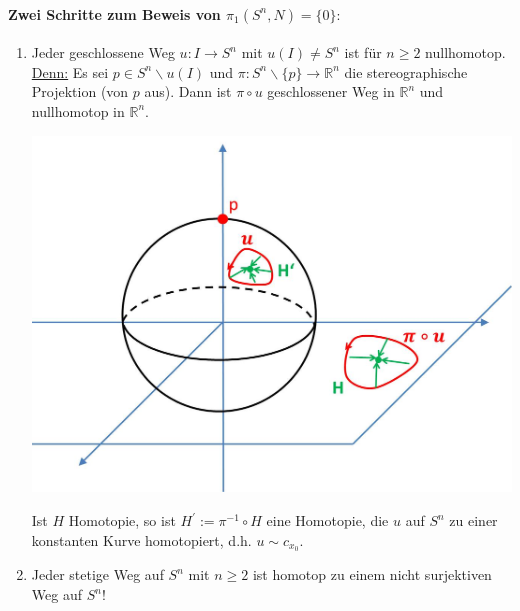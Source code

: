 \documentclass[a4paper,11pt,notitlepage]{report}
\theoremstyle{definition}
\newcommand{\R}{{\ensuremath{\mathbb{R}}}}
\begin{document}
\paragraph{Zwei Schritte zum Beweis von $\pi_1(S^n,N) = \{0\}:$}
\begin{enumerate}
	\item Jeder geschlossene Weg $u \colon I \rightarrow S^n$ mit $u(I) \neq S^n$ ist für $n \geq 2$ nullhomotop.
	\newline
	\underline{Denn:} Es sei $p \in S^n \backslash u(I)$ und $\pi \colon S^n \backslash \{p\} \rightarrow \R^n$ die stereographische Projektion (von $p$ aus). Dann ist $\pi \circ u$ geschlossener Weg in $\R^n$ und nullhomotop in $\R^n$.
	\begin{center}
		 \includegraphics[scale=0.35]{images/Weg_S2_nullhomotop.jpg}
	\end{center}
	Ist $H$ Homotopie, so ist $H^\prime := \pi^{-1} \circ H$ eine Homotopie, die $u$ auf $S^n$ zu einer konstanten Kurve homotopiert, d.h. $u \sim c_{x_0}$.
	
	\item Jeder stetige Weg auf $S^n$ mit $n\geq 2$ ist homotop zu einem nicht surjektiven Weg auf $S^n$!
\end{enumerate}
\end{document}
